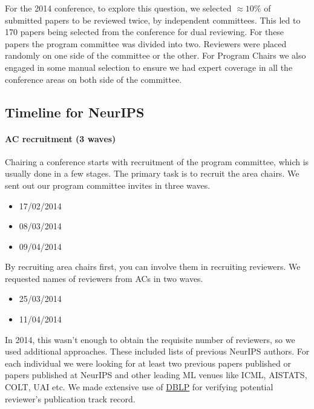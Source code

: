 For the 2014 conference, to explore this question, we selected
\(\approx 10\%\) of submitted papers to be reviewed twice, by
independent committees. This led to 170 papers being selected from the
conference for dual reviewing. For these papers the program committee
was divided into two. Reviewers were placed randomly on one side of the
committee or the other. For Program Chairs we also engaged in some
manual selection to ensure we had expert coverage in all the conference
areas on both side of the committee.

\hypertarget{timeline-for-neurips}{%
\subsection{Timeline for NeurIPS}\label{timeline-for-neurips}}

\begin{flushright}
\end{flushright}

\paragraph{AC recruitment (3 waves)}

Chairing a conference starts with recruitment of the program committee,
which is usually done in a few stages. The primary task is to recruit
the area chairs. We sent out our program committee invites in three
waves.

\begin{itemize}
\tightlist
\item
  17/02/2014
\item
  08/03/2014
\item
  09/04/2014
\end{itemize}

By recruiting area chairs first, you can involve them in recruiting
reviewers. We requested names of reviewers from ACs in two waves.

\begin{itemize}
\tightlist
\item
  25/03/2014
\item
  11/04/2014
\end{itemize}

In 2014, this wasn't enough to obtain the requisite number of reviewers,
so we used additional approaches. These included lists of previous
NeurIPS authors. For each individual we were looking for at least two
previous papers published or papers published at NeurIPS and other
leading ML venues like ICML, AISTATS, COLT, UAI etc. We made extensive
use of \href{https://dblp.uni-trier.de/}{DBLP} for verifying potential
reviewer's publication track record.


